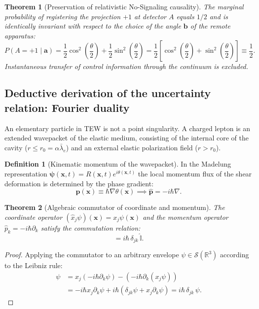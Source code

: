 \documentclass[11pt,a4paper]{article}
\providecommand{\lambdabar}{\bar{\lambda}}
\newtheorem{theorem}{Theorem}
\theoremstyle{definition}
\newtheorem{definition}{Definition}
\theoremstyle{remark}
\begin{document}
\begin{theorem}[Preservation of relativistic No-Signaling causality]
    \label{thm:no_signaling_exact_proof}
    The marginal probability of registering the projection $+1$ at detector $A$ equals $1/2$ and is identically invariant with respect to the choice of the angle $\mathbf{b}$ of the remote apparatus:
\begin{equation}
    P(A = +1 \mid \mathbf{a}) = \frac{1}{2}\cos^2\left(\frac{\theta}{2}\right) + \frac{1}{2}\sin^2\left(\frac{\theta}{2}\right) = \frac{1}{2}\left[\cos^2\left(\frac{\theta}{2}\right) + \sin^2\left(\frac{\theta}{2}\right)\right] \equiv \frac{1}{2}.
    \label{eq:no_signaling_exact_half}
\end{equation}
    Instantaneous transfer of control information through the continuum is excluded.
\end{theorem}

\subsection{Deductive derivation of the uncertainty relation: Fourier duality}

An elementary particle in TEW is not a point singularity. A charged lepton is an extended wavepacket of the elastic medium, consisting of the internal core of the cavity ($r \le r_0 = \alpha \lambdabar_e$) and an external elastic polarization field ($r > r_0$).

\begin{definition}[Kinematic momentum of the wavepacket]
	In the Madelung representation $\boldsymbol{\psi}(\mathbf{x}, t) = R(\mathbf{x}, t) e^{i\theta(\mathbf{x}, t)}$ the local momentum flux of the shear deformation is determined by the phase gradient:
	\begin{equation}
\mathbf{p}(\mathbf{x}) \equiv \hbar \nabla\theta(\mathbf{x}) \implies \hat{\mathbf{p}} = -i\hbar \nabla.
\label{eq:quantum_momentum_operator}
	\end{equation}
\end{definition}

\begin{theorem}[Algebraic commutator of coordinate and momentum]
\label{thm:canonical_commutator_exact}
The coordinate operator $(\hat{x}_j \psi)(\mathbf{x}) = x_j \psi(\mathbf{x})$ and the momentum operator $\hat{p}_k = -i\hbar \partial_k$ satisfy the commutation relation:
\begin{equation}
	[\hat{x}_j, \hat{p}_k] = i\hbar \, \delta_{jk} \, \hat{\mathbb{I}}.
	\label{eq:canonical_commutator}
\end{equation}
\end{theorem}
\begin{proof}
Applying the commutator to an arbitrary envelope $\psi \in \mathcal{S}(\mathbb{R}^3)$ according to the Leibniz rule:
\begin{align}
	[\hat{x}_j, \hat{p}_k] \psi &= x_j (-i\hbar \partial_k \psi) - (-i\hbar \partial_k (x_j \psi)) \nonumber \\
	&= -i\hbar x_j \partial_k \psi + i\hbar (\delta_{jk} \psi + x_j \partial_k \psi) = i\hbar \, \delta_{jk} \, \psi.
\end{align}
\end{proof}
\end{document}
